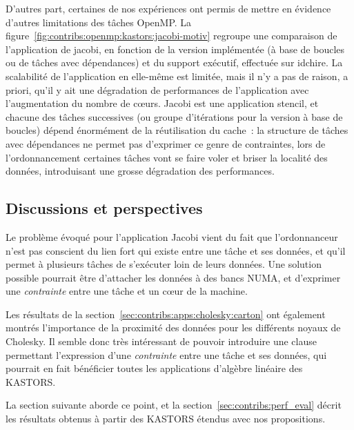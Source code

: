 D'autres part, certaines de nos expériences ont permis de mettre en évidence d'autres limitations des tâches OpenMP.
La figure~\ref{fig:contribs:openmp:kastors:jacobi-motiv} regroupe une comparaison de l'application de jacobi, en fonction de la version implémentée (à base de boucles ou de tâches avec dépendances) et du support exécutif, effectuée sur idchire.
La scalabilité de l'application en elle-même est limitée, mais il n'y a pas de raison, a priori, qu'il y ait une dégradation de performances de l'application avec l'augmentation du nombre de cœurs.
Jacobi est une application stencil, et chacune des tâches successives (ou groupe d'itérations pour la version à base de boucles) dépend énormément de la réutilisation du cache~: la structure de tâches avec dépendances ne permet pas d'exprimer ce genre de contraintes, lors de l'ordonnancement certaines tâches vont se faire voler et briser la localité des données, introduisant une grosse dégradation des performances.

\subsection{Discussions et perspectives}

Le problème évoqué pour l'application Jacobi vient du fait que l'ordonnanceur n'est pas conscient du lien fort qui existe entre une tâche et ses données, et qu'il permet à plusieurs tâches de s'exécuter loin de leurs données. Une solution possible pourrait être d'attacher les données à des bancs NUMA, et d'exprimer une \emph{contrainte} entre une tâche et un cœur de la machine.

Les résultats de la section~\ref{sec:contribs:apps:cholesky:carton} ont également montrés l'importance de la proximité des données pour les différents noyaux de Cholesky.
Il semble donc très intéressant de pouvoir introduire une clause permettant l'expression d'une \emph{contrainte} entre une tâche et ses données, qui pourrait en fait bénéficier toutes les applications d'algèbre linéaire des KASTORS.

La section suivante aborde ce point, et la section~\ref{sec:contribs:perf_eval} décrit les résultats obtenus à partir des KASTORS étendus avec nos propositions.


